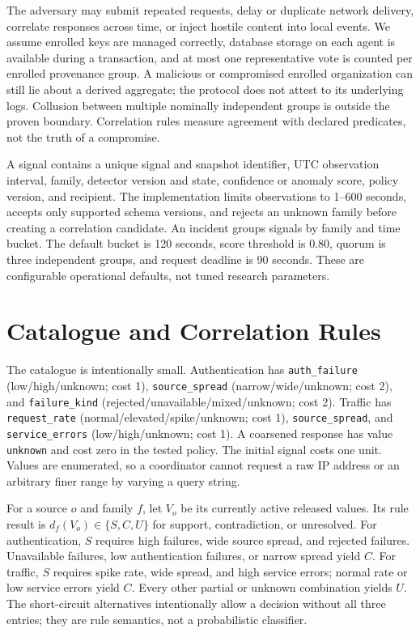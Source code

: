 \documentclass[conference,letterpaper]{IEEEtran}
\begin{document}
The adversary may submit repeated requests, delay or duplicate network delivery, correlate responses across time, or inject hostile content into local events. We assume enrolled keys are managed correctly, database storage on each agent is available during a transaction, and at most one representative vote is counted per enrolled provenance group. A malicious or compromised enrolled organization can still lie about a derived aggregate; the protocol does not attest to its underlying logs. Collusion between multiple nominally independent groups is outside the proven boundary. Correlation rules measure agreement with declared predicates, not the truth of a compromise.

A signal contains a unique signal and snapshot identifier, UTC observation interval, family, detector version and state, confidence or anomaly score, policy version, and recipient. The implementation limits observations to 1--600 seconds, accepts only supported schema versions, and rejects an unknown family before creating a correlation candidate. An incident groups signals by family and time bucket. The default bucket is 120 seconds, score threshold is 0.80, quorum is three independent groups, and request deadline is 90 seconds. These are configurable operational defaults, not tuned research parameters.

\section{Catalogue and Correlation Rules}
The catalogue is intentionally small. Authentication has \texttt{auth\_failure} (low/high/unknown; cost 1), \texttt{source\_spread} (narrow/wide/unknown; cost 2), and \texttt{failure\_kind} (rejected/unavailable/mixed/unknown; cost 2). Traffic has \texttt{request\_rate} (normal/elevated/spike/unknown; cost 1), \texttt{source\_spread}, and \texttt{service\_errors} (low/high/unknown; cost 1). A coarsened response has value \texttt{unknown} and cost zero in the tested policy. The initial signal costs one unit. Values are enumerated, so a coordinator cannot request a raw IP address or an arbitrary finer range by varying a query string.

For a source $o$ and family $f$, let $V_o$ be its currently active released values. Its rule result is $d_f(V_o)\in\{S,C,U\}$ for support, contradiction, or unresolved. For authentication, $S$ requires high failures, wide source spread, and rejected failures. Unavailable failures, low authentication failures, or narrow spread yield $C$. For traffic, $S$ requires spike rate, wide spread, and high service errors; normal rate or low service errors yield $C$. Every other partial or unknown combination yields $U$. The short-circuit alternatives intentionally allow a decision without all three entries; they are rule semantics, not a probabilistic classifier.
\end{document}
